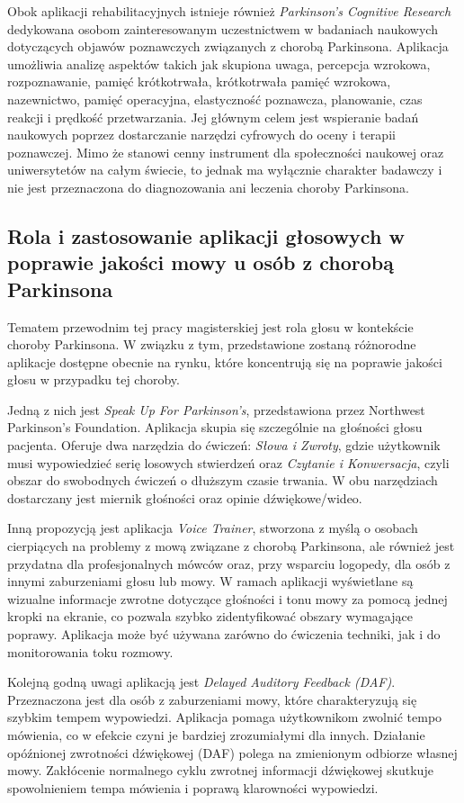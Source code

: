 Obok aplikacji rehabilitacyjnych istnieje również \emph{Parkinson's Cognitive Research} dedykowana osobom zainteresowanym uczestnictwem w badaniach
naukowych dotyczących objawów poznawczych związanych z chorobą Parkinsona.
Aplikacja umożliwia analizę aspektów takich jak skupiona uwaga, percepcja wzrokowa, rozpoznawanie, pamięć krótkotrwała,
krótkotrwała pamięć wzrokowa, nazewnictwo, pamięć operacyjna, elastyczność poznawcza, planowanie, czas reakcji i prędkość przetwarzania.
Jej głównym celem jest wspieranie badań naukowych poprzez dostarczanie narzędzi cyfrowych do oceny i terapii poznawczej.
Mimo że stanowi cenny instrument dla społeczności naukowej oraz uniwersytetów na całym świecie, to jednak ma wyłącznie charakter badawczy i nie jest przeznaczona do diagnozowania ani leczenia choroby Parkinsona.

\subsection{Rola i zastosowanie aplikacji głosowych w poprawie jakości mowy u osób z chorobą Parkinsona}
\label{subsec:aplikacje-glosowe}

Tematem przewodnim tej pracy magisterskiej jest rola głosu w kontekście choroby Parkinsona. W związku z tym, przedstawione
zostaną różnorodne aplikacje dostępne obecnie na rynku, które koncentrują się na poprawie jakości głosu w przypadku tej choroby.

Jedną z nich jest \emph{Speak Up For Parkinson's}, przedstawiona przez Northwest Parkinson's Foundation.
Aplikacja skupia się szczególnie na głośności głosu pacjenta.
Oferuje dwa narzędzia do ćwiczeń: \emph{Słowa i Zwroty}, gdzie użytkownik musi wypowiedzieć serię losowych stwierdzeń oraz \emph{Czytanie i Konwersacja}, czyli obszar do swobodnych ćwiczeń o dłuższym czasie trwania.
W obu narzędziach dostarczany jest miernik głośności oraz opinie dźwiękowe/wideo.

Inną propozycją jest aplikacja \emph{Voice Trainer}, stworzona z myślą o osobach cierpiących na problemy z mową związane z chorobą Parkinsona,
ale również jest przydatna dla profesjonalnych mówców oraz, przy wsparciu logopedy, dla osób z innymi zaburzeniami głosu lub mowy.
W ramach aplikacji wyświetlane są wizualne informacje zwrotne dotyczące głośności i tonu mowy za pomocą jednej kropki na ekranie, co pozwala szybko
zidentyfikować obszary wymagające poprawy.
Aplikacja może być używana zarówno do ćwiczenia techniki, jak i do monitorowania toku rozmowy.

Kolejną godną uwagi aplikacją jest \emph{Delayed Auditory Feedback (DAF)}.
Przeznaczona jest dla osób z zaburzeniami mowy, które charakteryzują się szybkim tempem wypowiedzi.
Aplikacja pomaga użytkownikom zwolnić tempo mówienia, co w efekcie czyni je bardziej zrozumiałymi dla innych.
Działanie opóźnionej zwrotności dźwiękowej (DAF) polega na zmienionym odbiorze własnej mowy.
Zakłócenie normalnego cyklu zwrotnej informacji dźwiękowej skutkuje spowolnieniem tempa mówienia i poprawą klarowności wypowiedzi.

